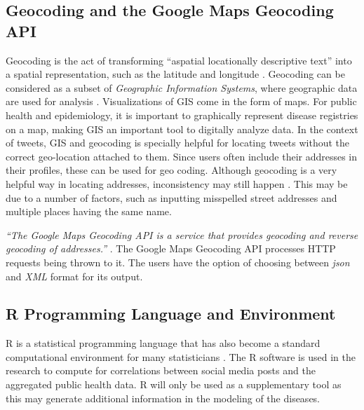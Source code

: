 \subsection{Geocoding and the Google Maps Geocoding API}

Geocoding is the act of transforming ``aspatial locationally descriptive text'' into a spatial representation, such as the latitude and longitude \cite{goldberg2008geocoding}. Geocoding can be considered as a subset of \textit{Geographic Information Systems}, where geographic data are used for analysis \cite{cromley2011gis}. Visualizations of GIS come in the form of maps. For public health and epidemiology, it is important to graphically represent disease registries on a map, making GIS an important tool to digitally analyze data. In the context of tweets, GIS and geocoding is specially helpful for locating tweets without the correct geo-location attached to them. Since users often include their addresses in their profiles, these can be used for geo coding. Although geocoding is a very helpful way in locating addresses, inconsistency may still happen \cite{krieger2001wrong}. This may be due to a number of factors, such as inputting misspelled street addresses and multiple places having the same name. 

\textit{``The Google Maps Geocoding API is a service that provides geocoding and reverse geocoding of addresses.''} \cite{GoogleGeocode}. The Google Maps Geocoding API processes HTTP requests being thrown to it. The users have the option of choosing between \textit{json} and \textit{XML} format for its output. 

\subsection{R Programming Language and Environment}
R is a statistical programming language that has also become a standard computational environment for many statisticians \cite{ihaka1996r}. The R software is used in the research to compute for correlations between social media posts and the aggregated public health data. R will only be used as a supplementary tool as this may generate additional information in the modeling of the diseases.


